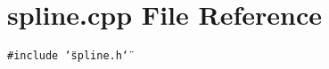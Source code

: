 \section{spline.cpp File Reference}
\label{spline_8cpp}
{\tt \#include \char`\"{}spline.h\char`\"{}}\par
